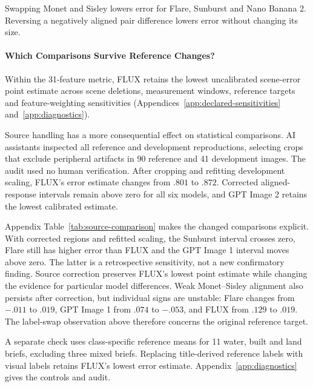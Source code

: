 Swapping Monet and Sisley lowers error for Flare, Sunburst and Nano Banana 2.
Reversing a negatively aligned pair difference lowers error without changing its size.




\paragraph{Which Comparisons Survive Reference Changes?}
Within the 31-feature metric, FLUX retains the lowest uncalibrated scene-error point
estimate across scene deletions, measurement windows, reference targets and
feature-weighting sensitivities (Appendices~\ref{app:declared-sensitivities}
and~\ref{app:diagnostics}).

Source handling has a more consequential effect on statistical comparisons.
AI assistants inspected all reference and development reproductions, selecting
crops that exclude peripheral artifacts in 90 reference and 41 development images.
The audit used no human verification. After cropping and refitting development scaling,
FLUX's error estimate changes from $.801$ to $.872$. Corrected aligned-response
intervals remain above zero for all six models, and GPT Image 2 retains the lowest
calibrated estimate.

Appendix Table~\ref{tab:source-comparison} makes the changed comparisons explicit. With
corrected regions and refitted scaling, the Sunburst interval crosses zero,
Flare still has higher error than FLUX and the GPT Image 1 interval moves above zero. The latter
is a retrospective sensitivity, not a new confirmatory finding. Source correction
preserves FLUX's lowest point estimate while changing the evidence for particular
model differences.
Weak Monet--Sisley alignment also persists after correction, but individual
signs are unstable: Flare changes from $-.011$ to $.019$, GPT Image 1 from
$.074$ to $-.053$, and FLUX from $.129$ to $.019$. The label-swap observation
above therefore concerns the original reference target.






A separate check uses class-specific reference means for 11 water, built and
land briefs, excluding three mixed briefs. Replacing title-derived reference
labels with visual labels retains FLUX's lowest error estimate.
Appendix~\ref{app:diagnostics} gives the controls and audit.\par



